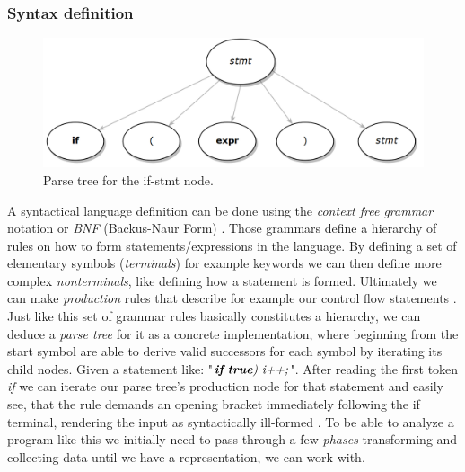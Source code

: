 \subsubsection{Syntax definition}
\begin{figure}
	\begin{center}
		\includegraphics[width=.32\textwidth, height=0.12\textheight]{PICs/parse_tree}
	\end{center}
	\caption{Parse tree for the if-stmt node.}\label{parse_tree}
\end{figure}
\vspace{-0.5cm}
A syntactical language definition can be done using the \textit{context free grammar} notation or \textit{BNF} (Backus-Naur Form) . Those grammars define a hierarchy of rules on how to form statements/expressions in the language. By defining a set of elementary symbols (\textit{terminals}) for example keywords we can then define more complex \textit{nonterminals}, like defining how a statement is formed. Ultimately we can make \textit{production} rules that describe for example our control flow statements . Just like this set of grammar rules basically constitutes a hierarchy, we can deduce a \textit{parse tree} for it as a concrete implementation, where beginning from the start symbol are able to derive valid successors for each symbol by iterating its child nodes. Given a statement like: "$\textit{\textbf{if} \textbf{true}) i++;}$". After reading the first token \textit{if} we can iterate our parse tree's production node for that statement and easily see, that the rule demands an opening bracket immediately following the if terminal, rendering the input as syntactically ill-formed . To be able to analyze a program like this we initially need to pass through a few \textit{phases} transforming and collecting data until we have a representation, we can work with.

